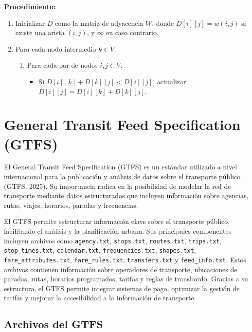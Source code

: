 \documentclass[openany]{book}
\begin{document}
			\textbf{Procedimiento:}
			\begin{enumerate}
				\item Inicializar $D$ como la matriz de adyacencia $W$, donde $D[i][j] = w(i,j)$ si existe una arista $(i,j)$, y $\infty$ en caso contrario.
				\item Para cada nodo intermedio $k \in V$:
				\begin{enumerate}
					\item Para cada par de nodos $i, j \in V$:
					\begin{itemize}
						\item Si $D[i][k] + D[k][j] < D[i][j]$, actualizar $D[i][j] = D[i][k] + D[k][j]$.
					\end{itemize}
				\end{enumerate}
			\end{enumerate}

    \section{General Transit Feed Specification (GTFS)}

		El General Transit Feed Specification (GTFS) es un estándar utilizado a nivel internacional para la publicación y análisis de datos sobre el transporte público (GTFS, 2025). Su importancia radica en la posibilidad de modelar la red de transporte mediante datos estructurados que incluyen información sobre agencias, rutas, viajes, horarios, paradas y frecuencias.

		El GTFS permite estructurar información clave sobre el transporte público, facilitando el análisis y la planificación urbana. Sus principales componentes incluyen archivos como \texttt{agency.txt}, \texttt{stops.txt}, \texttt{routes.txt}, \texttt{trips.txt}, \texttt{stop\_times.txt}, \texttt{calendar.txt}, \texttt{frequencies.txt}, \texttt{shapes.txt}, \texttt{fare\_attributes.txt}, \texttt{fare\_rules.txt}, \texttt{transfers.txt} y \texttt{feed\_info.txt}. Estos archivos contienen información sobre operadores de transporte, ubicaciones de paradas, rutas, horarios programados, tarifas y reglas de transbordo. Gracias a su estructura, el GTFS permite integrar sistemas de pago, optimizar la gestión de tarifas y mejorar la accesibilidad a la información de transporte.

		\subsection{Archivos del GTFS}
\end{document}
